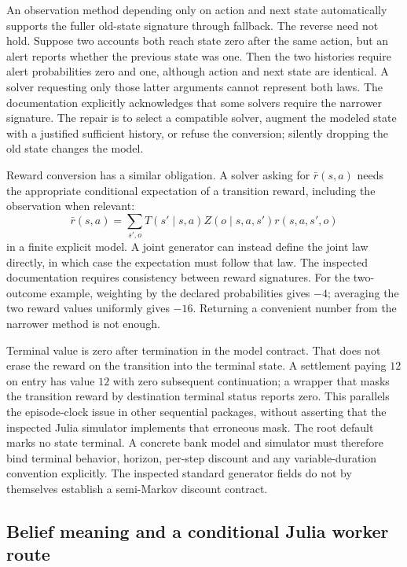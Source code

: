 An observation method depending only on action and next state automatically
supports the fuller old-state signature through fallback. The reverse need
not hold. Suppose two accounts both reach state zero after the same action,
but an alert reports whether the previous state was one. Then the two histories
require alert probabilities zero and one, although action and next state are
identical. A solver requesting only those latter arguments cannot represent
both laws. The documentation explicitly acknowledges that some solvers require
the narrower signature. The repair is to select a compatible solver, augment
the modeled state with a justified sufficient history, or refuse the conversion;
silently dropping the old state changes the model.
\citep{exec23_pomdpsjl_sources,exec23_pomdpsjl_reference}

Reward conversion has a similar obligation. A solver asking for
$\bar r(s,a)$ needs the appropriate conditional expectation of a transition
reward, including the observation when relevant:
\[
 \bar r(s,a)=\sum_{s',o}T(s'\mid s,a)Z(o\mid s,a,s')r(s,a,s',o)
\]
in a finite explicit model. A joint generator can instead define the joint law
directly, in which case the expectation must follow that law. The inspected
documentation requires consistency between reward signatures. For the
two-outcome example, weighting by the declared probabilities gives $-4$;
averaging the two reward values uniformly gives $-16$. Returning a convenient
number from the narrower method is not enough.
\citep{exec23_pomdpsjl_sources,exec23_pomdpsjl_reference}

Terminal value is zero after termination in the model contract. That does not
erase the reward on the transition into the terminal state. A settlement
paying $12$ on entry has value $12$ with zero subsequent continuation; a wrapper
that masks the transition reward by destination terminal status reports zero.
This parallels the episode-clock issue in other sequential packages, without
asserting that the inspected Julia simulator implements that erroneous mask.
The root default marks no state terminal. A concrete bank model and simulator
must therefore bind terminal behavior, horizon, per-step discount and any
variable-duration convention explicitly. The inspected standard generator
fields do not by themselves establish a semi-Markov discount contract.
\citep{exec23_pomdpsjl_sources,exec23_pomdpsjl_reference}

\subsection{Belief meaning and a conditional Julia worker route}
\label{exec23:pomdpsjl-decision}

